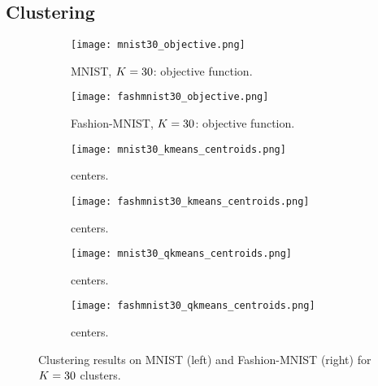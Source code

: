 
\subsection{Clustering}

\begin{figure*}[h]
\begin{subfigure}[b]{.49\textwidth}
\texttt{[image: mnist30\_objective.png]}
\caption{MNIST, $K=30$: objective function.}
\label{fig:mnist:objfun}
\end{subfigure}
\begin{subfigure}[b]{.49\textwidth}
\texttt{[image: fashmnist30\_objective.png]}
\caption{Fashion-MNIST, $K=30$: objective function.}
\label{fig:fmnist:objfun}
\end{subfigure}
\begin{subfigure}[t]{.49\textwidth}
\texttt{[image: mnist30\_kmeans\_centroids.png]}
\caption{\kmeans centers.}
\label{fig:mnist:kmeans:centers}
\end{subfigure}
\begin{subfigure}[t]{.49\textwidth}
\texttt{[image: fashmnist30\_kmeans\_centroids.png]}
\caption{\kmeans centers.}
\label{fig:fmnist:kmeans:centers}
\end{subfigure}
\begin{subfigure}[t]{.49\textwidth}
\texttt{[image: mnist30\_qkmeans\_centroids.png]}
\caption{\qkmeans centers.}
\label{fig:mnist:qkmeans:centers}
\end{subfigure}
\begin{subfigure}[t]{.49\textwidth}
\texttt{[image: fashmnist30\_qkmeans\_centroids.png]}
\caption{\qkmeans centers.}
\label{fig:fmnist:qkmeans:centers}
\end{subfigure}
\caption{Clustering results on MNIST (left) and Fashion-MNIST (right) for $K=30$ clusters.}
\label{fig:clustering:realdata}
\end{figure*}

